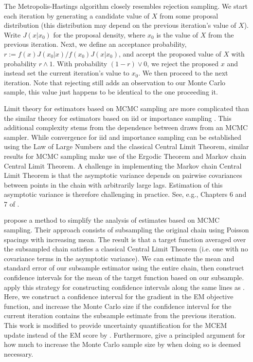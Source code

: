\documentclass[11pt, oneside]{article}   	%
\begin{document}
The Metropolis-Hastings algorithm closely resembles rejection sampling. We start each iteration by generating a candidate value of $X$ from some proposal distribution (this distribution may depend on the previous iteration's value of $X$). Write $J(x | x_0)$ for the proposal density, where $x_0$ is the value of $X$ from the previous iteration. Next, we define an acceptance probability, $r := f(x) J(x_0 | x) / f(x_0) J(x | x_0)$, and accept the proposed value of $X$ with probability $r \wedge 1$. With probability $(1-r) \vee 0$, we reject the proposed $x$ and instead set the current iteration's value to $x_0$. We then proceed to the next iteration. Note that rejecting still adds an observation to our Monte Carlo sample, this value just happens to be identical to the one proceeding it.

Limit theory for estimators based on MCMC sampling are more complicated than the similar theory for estimators based on iid or importance sampling \citep{Gey91}. This additional complexity stems from the dependence between draws from an MCMC sampler. While convergence for iid and importance sampling can be established using the Law of Large Numbers and the classical Central Limit Theorem, similar results for MCMC sampling make use of the Ergodic Theorem and Markov chain Central Limit Theorem. A challenge in implementing the Markov chain Central Limit Theorem is that the asymptotic variance depends on pairwise covariances between points in the chain with arbitrarily large lags. Estimation of this asymptotic variance is therefore challenging in practice. See, e.g., Chapters 6 and 7 of \citet{Rob04}.

\citet{Lev01} propose a method to simplify the analysis of estimates based on MCMC sampling. Their approach consists of subsampling the original chain using Poisson spacings with increasing mean. The result is that a target function averaged over the subsampled chain satisfies a classical Central Limit Theorem (i.e. one with no covariance terms in the asymptotic variance). We can estimate the mean and standard error of our subsample estimator using the entire chain, then construct confidence intervals for the mean of the target function based on our subsample. \citeauthor{Lev01} apply this strategy for constructing confidence intervals along the same lines as \citet{Boo99}. Here, we construct a confidence interval for the gradient in the EM objective function, and increase the Monte Carlo size if the confidence interval for the current iteration contains the subsample estimate from the previous iteration. This work is modified to provide uncertainty quantification for the MCEM update instead of the EM score by \citet{Lev04}. Furthermore, \citeauthor{Lev04} give a principled argument for how much to increase the Monte Carlo sample size by when doing so is deemed necessary.
\end{document}
